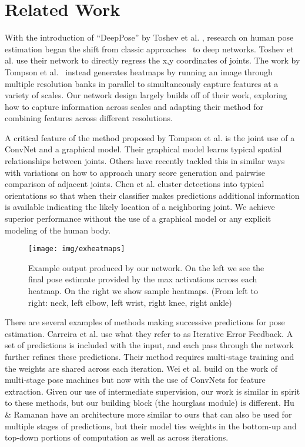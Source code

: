\documentclass[runningheads]{llncs}
\begin{document}
\section{Related Work}

With the introduction of ``DeepPose'' by Toshev et
al. \cite{toshev2014deeppose}, research on human pose estimation began
the shift from classic approaches~\cite{felz08, pish13strong,
  bourdev2009poselets, sapp2013modec, johnson2011learning,
  ramanan2006learning, yang2013articulated, ferrari2008progressive,
  ladicky2013human} to deep networks.  Toshev et al. use their network
to directly regress the x,y coordinates of joints. The work by Tompson
et al.~\cite{tompson2014joint} instead generates heatmaps by running
an image through multiple resolution banks in parallel to
simultaneously capture features at a variety of scales. Our network
design largely builds off of their work, exploring how to capture
information across scales and adapting their method for combining
features across different resolutions.

A critical feature of the method proposed by Tompson et
al. \cite{tompson2014joint} is the joint use of a ConvNet and a
graphical model. Their graphical model learns typical spatial
relationships between joints. Others have recently tackled this in
similar ways \cite{fan2015combining, chen2014articulated,
  pish15deepcut} with variations on how to approach unary score
generation and pairwise comparison of adjacent joints. Chen et
al. \cite{chen2014articulated} cluster detections into typical
orientations so that when their classifier makes predictions
additional information is available indicating the likely location of
a neighboring joint. We achieve superior performance without the use
of a graphical model or any explicit modeling of the human body.

\begin{figure}[t]
\centering
\texttt{[image: img/exheatmaps]}
\caption{Example output produced by our network. On the left we see
  the final pose estimate provided by the max activations across each
  heatmap. On the right we show sample heatmaps. (From left to right:
  neck, left elbow, left wrist, right knee, right ankle)}
\label{fig:exheatmaps}
\end{figure}

There are several examples of methods making successive predictions
for pose estimation. Carreira et al. \cite{carreira2015human} use what
they refer to as Iterative Error Feedback. A set of predictions is
included with the input, and each pass through the network further
refines these predictions. Their method requires multi-stage training
and the weights are shared across each iteration. Wei et
al. \cite{wei2016machines} build on the work of multi-stage pose
machines \cite{ramakrishna2014pose} but now with the use of ConvNets
for feature extraction. Given our use of intermediate supervision, our
work is similar in spirit to these methods, but our building block
(the hourglass module) is different. Hu \& Ramanan
\cite{hu2016bottomup} have an architecture more similar to ours that
can also be used for multiple stages of predictions, but their model
ties weights in the bottom-up and top-down portions of computation as
well as across iterations.
\end{document}
